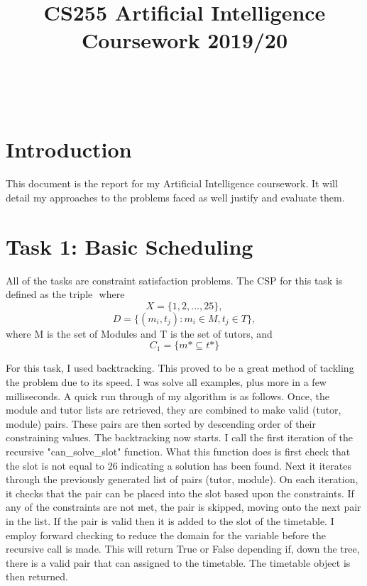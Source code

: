 \documentclass[conference]{IEEEtran}
\begin{document}
\title{CS255 Artificial Intelligence Coursework 2019/20} \\

\author{
}

\maketitle

\section{Introduction}
This document is the report for my Artificial Intelligence coursework. It will detail my approaches to the problems faced as well justify and evaluate them.

\section{Task 1: Basic Scheduling}
All of the tasks are constraint satisfaction problems. The CSP for this task is defined as the triple \(<X, D, C>\) where 
\begin{equation}
X = \{1, 2,..., 25\},
\end{equation}
\begin{equation}
D = \{(m_{i}, t_{j}): m_{i}\in M, t_{j}\in T\},
\end{equation}
where M is the set of Modules and T is the set of tutors, and
\begin{equation}
C_{1} = \{m*\subseteq t*\}
\end{equation}

For this task, I used backtracking. This proved to be a great method of tackling the problem due to its speed. I was solve all examples, plus more in a few milliseconds. A quick run through of my algorithm is as follows. Once, the module and tutor lists are retrieved, they are combined to make valid (tutor, module) pairs. These pairs are then sorted by descending order of their constraining values. The backtracking now starts. I call the first iteration of the recursive "can\_solve\_slot" function. What this function does is first check that the slot is not equal to 26 indicating a solution has been found. Next it iterates through the previously generated list of pairs (tutor, module). On each iteration, it checks that the pair can be placed into the slot based upon the constraints. If any of the constraints are not met, the pair is skipped, moving onto the next pair in the list. If the pair is valid then it is added to the slot of the timetable. I employ forward checking to reduce the domain for the variable before the recursive call is made. This will return True or False depending if, down the tree, there is a valid pair that can assigned to the timetable. The timetable object is then returned.
\end{document}
